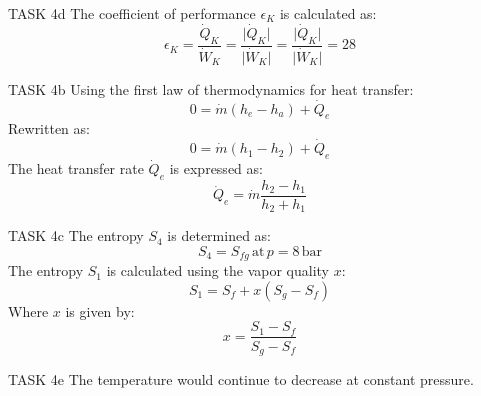 TASK 4d  
The coefficient of performance \( \epsilon_K \) is calculated as:  
\[
\epsilon_K = \frac{\dot{Q}_K}{\dot{W}_K} = \frac{\lvert \dot{Q}_K \rvert}{\lvert \dot{W}_K \rvert} = \frac{\lvert \dot{Q}_K \rvert}{\lvert \dot{W}_K \rvert} = 28
\]

TASK 4b  
Using the first law of thermodynamics for heat transfer:  
\[
0 = \dot{m} (h_e - h_a) + \dot{Q}_e
\]  
Rewritten as:  
\[
0 = \dot{m} (h_1 - h_2) + \dot{Q}_e
\]  
The heat transfer rate \( \dot{Q}_e \) is expressed as:  
\[
\dot{Q}_e = \dot{m} \frac{h_2 - h_1}{h_2 + h_1}
\]

TASK 4c  
The entropy \( S_4 \) is determined as:  
\[
S_4 = S_{fg} \, \text{at} \, p = 8 \, \text{bar}
\]  
The entropy \( S_1 \) is calculated using the vapor quality \( x \):  
\[
S_1 = S_f + x (S_g - S_f)
\]  
Where \( x \) is given by:  
\[
x = \frac{S_1 - S_f}{S_g - S_f}
\]

TASK 4e  
The temperature would continue to decrease at constant pressure.  
